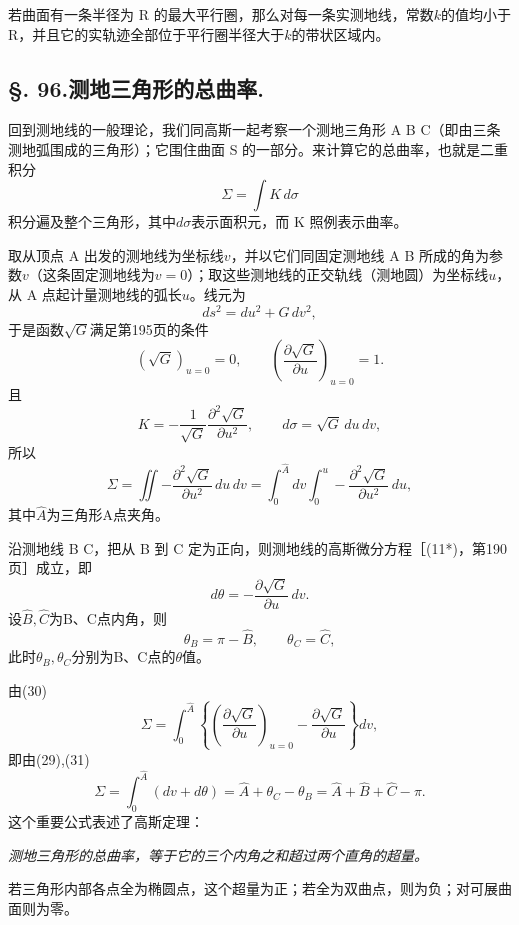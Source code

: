 若曲面有一条半径为 R 的最大平行圈，那么对每一条实测地线，常数\(k\)的值均小于 R，并且它的实轨迹全部位于平行圈半径大于\(k\)的带状区域内。

\subsection*{\S. 96.\quad 测地三角形的总曲率.}

回到测地线的一般理论，我们同高斯一起考察一个测地三角形 A B C（即由三条测地弧围成的三角形）；它围住曲面 S 的一部分。来计算它的总曲率，也就是二重积分
\[
 \Sigma=\int K\,d\sigma
\]
积分遍及整个三角形，其中\(d\sigma\)表示面积元，而 K 照例表示曲率。

取从顶点 A 出发的测地线为坐标线\(v\)，并以它们同固定测地线 A B 所成的角为参数\(v\)（这条固定测地线为\(v=0\)）；取这些测地线的正交轨线（测地圆）为坐标线\(u\)，从 A 点起计量测地线的弧长\(u\)。线元为
\[
 ds^2=du^2+G\,dv^2,
\]
于是函数\(\sqrt G\)满足第195页的条件
\begin{equation}\tag{29}
 \left(\sqrt G\right)_{u=0}=0,
  \qquad
 \left(\frac{\partial\sqrt G}{\partial u}\right)_{u=0}=1.
\end{equation}
且
\[
 K=-\frac1{\sqrt G}\frac{\partial^2\sqrt G}{\partial u^2},
  \qquad
 d\sigma=\sqrt G\,du\,dv,
\]
所以
\begin{equation}\tag{30}
 \Sigma=\iint -\frac{\partial^2\sqrt G}{\partial u^2}\,du\,dv
 =\int_0^{\widehat A}dv\int_0^u -\frac{\partial^2\sqrt G}{\partial u^2}\,du,
\end{equation}
其中\(\widehat A\)为三角形A点夹角。

沿测地线 B C，把从 B 到 C 定为正向，则测地线的高斯微分方程［(11*)，第190页］成立，即
\begin{equation}\tag{31}
 d\theta=-\frac{\partial\sqrt G}{\partial u}\,dv.
\end{equation}
设\(\widehat B,\widehat C\)为B、C点内角，则
\[
 \theta_B=\pi-\widehat B,\qquad \theta_C=\widehat C,
\]
此时\(\theta_B,\theta_C\)分别为B、C点的\(\theta\)值。

由(30)
\[
 \Sigma=\int_0^{\widehat A}\left\{\left(\frac{\partial\sqrt G}{\partial u}\right)_{u=0}-\frac{\partial\sqrt G}{\partial u}\right\}dv,
\]
即由(29),(31)
\[
 \Sigma=\int_0^{\widehat A}(dv+d\theta)=\widehat A+\theta_C-\theta_B=\widehat A+\widehat B+\widehat C-\pi.
\]
这个重要公式表述了高斯定理：

\emph{测地三角形的总曲率，等于它的三个内角之和超过两个直角的超量。}

若三角形内部各点全为椭圆点，这个超量为正；若全为双曲点，则为负；对可展曲面则为零。

